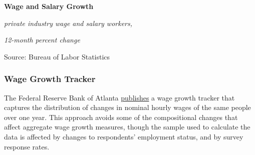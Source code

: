 \documentclass{report}
\makeatletter
\newcommand{\tbllink}[1]{\href{https://raw.githubusercontent.com/bdecon/US-chartbook/master/chartbook/data/#1}{\faTable}}
\newcommand*\short[1]{\expandafter\@gobbletwo\number\numexpr#1\relax}
\newcommand{\dateaxisticks}{
		date coordinates in=x, axis line style={draw=none},
		xmax={2020-08-10},
		max space between ticks=40,	    
		xtick={{1990-01-01}, {1992-01-01}, {1994-01-01}, 
			{1996-01-01}, {1998-01-01}, {2000-01-01}, 
			{2002-01-01}, {2004-01-01}, {2006-01-01},
			{2008-01-01}, {2010-01-01}, {2012-01-01}, {2014-01-01},
		    {2016-01-01}, {2018-01-01}, {2020-01-01}},
		minor xtick={{1989-01-01}, {1991-01-01}, {1993-01-01},
			{1995-01-01}, {1997-01-01}, {1999-01-01}, 
			{2001-01-01}, {2003-01-01}, {2005-01-01}, {2007-01-01},
		    {2009-01-01}, {2011-01-01}, {2013-01-01}, {2015-01-01},
		    {2017-01-01}, {2019-01-01}},
		enlarge y limits={0.06}, enlarge x limits={0.01},
		}
\newcommand{\bbar}[2]{extra #1 ticks = {{#2}}, extra #1 tick labels = ,
		extra #1 tick style = {grid=major, grid style={thick, black!25}},}
\newcommand{\stdline}[4]{\addplot[very thick, no markers, color=#1] 
		table [x=#2, y=#3, col sep=comma] {#4};	}
\newcommand{\rebars}{
		\fill[color=black!10] (axis cs:{2007-12-01},\pgfkeysvalueof{/pgfplots/ymin}) rectangle 
			(axis cs:{2009-07-01}, \pgfkeysvalueof{/pgfplots/ymax});
		\fill[color=black!10] (axis cs:{2001-03-01},\pgfkeysvalueof{/pgfplots/ymin}) rectangle 
			(axis cs:{2001-11-01}, \pgfkeysvalueof{/pgfplots/ymax});
		\fill[color=black!10] (axis cs:{2020-02-01},\pgfkeysvalueof{/pgfplots/ymin}) rectangle 
			(axis cs:{2020-09-01}, \pgfkeysvalueof{/pgfplots/ymax});}
\makeatother
\begin{document}
{{{{{{{{{\vspace{2mm}

\begin{minipage}{0.44\textwidth}

\normalsize \textbf{Wage and Salary Growth}

\footnotesize{\textit{private industry wage and salary workers,}}

\footnotesize{\textit{12-month percent change}}

\hspace*{-2mm} 

\footnotesize{Source: Bureau of Labor Statistics} \hfill \tbllink{eci.csv}

\end{minipage} \hspace{6mm} \begin{minipage}{0.27\textwidth}
\small 

\end{minipage}

\newpage

\subsubsection*{\color{black!70} \seriffont Wage Growth Tracker}

\begin{minipage}{0.76\textwidth}

\small The Federal Reserve Bank of Atlanta \href{https://www.frbatlanta.org/chcs/wage-growth-tracker}{publishes} a wage growth tracker that captures the distribution of changes in nominal hourly wages of the same people over one year. This approach avoids some of the compositional changes that affect aggregate wage growth measures, though the sample used to calculate the data is affected by changes to respondents' employment status, and by survey response rates. \\



\vspace{6mm}


\end{minipage}}}}}}}}}}
\end{document}

